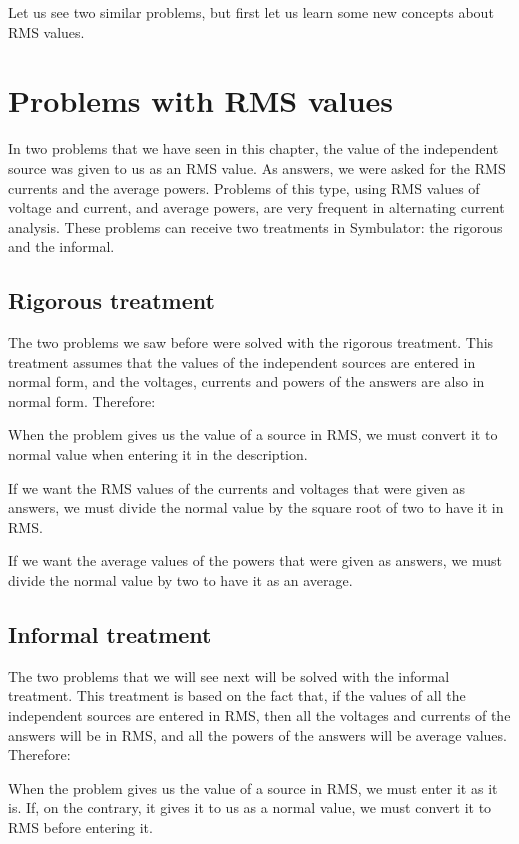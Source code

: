 Let us see two similar problems, but first let us learn some new
concepts about RMS values.

\section{Problems with RMS values}

In two problems that we have seen in this chapter, the value of the
independent source was given to us as an RMS value. As answers, we
were asked for the RMS currents and the average powers. Problems of
this type, using RMS values of voltage and current, and average
powers, are very frequent in alternating current analysis. These
problems can receive two treatments in Symbulator: the rigorous and
the informal.

\subsection{Rigorous treatment}

The two problems we saw before were solved with the rigorous
treatment. This treatment assumes that the values of the independent
sources are entered in normal form, and the voltages, currents and
powers of the answers are also in normal form. Therefore:

When the problem gives us the value of a source in RMS, we must
convert it to normal value when entering it in the description.

If we want the RMS values of the currents and voltages that were
given as answers, we must divide the normal value by the square root
of two to have it in RMS.

If we want the average values of the powers that were given as
answers, we must divide the normal value by two to have it as an
average.

\subsection{Informal treatment}

The two problems that we will see next will be solved with the
informal treatment. This treatment is based on the fact that, if the
values of all the independent sources are entered in RMS, then all
the voltages and currents of the answers will be in RMS, and all the
powers of the answers will be average values. Therefore:

When the problem gives us the value of a source in RMS, we must
enter it as it is. If, on the contrary, it gives it to us as a
normal value, we must convert it to RMS before entering it.

